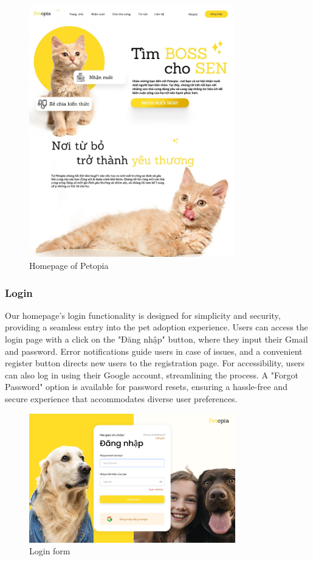 \begin {figure}[H]
\centering
\includegraphics[width=0.8\textwidth]{Figures/home_ui.jpg}
\caption{Homepage of Petopia}
\end{figure}

\subsubsection{Login}

Our homepage's login functionality is designed for simplicity and security, providing a seamless entry into the pet adoption experience. Users can access the login page with a click on the "Đăng nhập" button, where they input their Gmail and password. Error notifications guide users in case of issues, and a convenient register button directs new users to the registration page. For accessibility, users can also log in using their Google account, streamlining the process. A "Forgot Password" option is available for password resets, ensuring a hassle-free and secure experience that accommodates diverse user preferences.

\begin{figure}[H]
    \centering
    \includegraphics[width=0.8\textwidth]{Figures/login_ui.png}
    \caption{Login form}
\end{figure}

